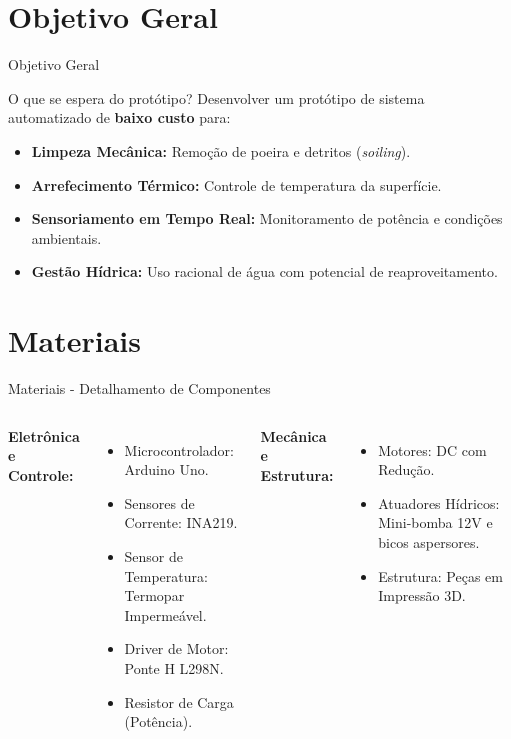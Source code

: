 \documentclass[aspectratio=169, xcolor={table}]{beamer}
\begin{document}

\section{Objetivo Geral}
\begin{frame}{Objetivo Geral}
    \begin{block}{O que se espera do protótipo?}
        Desenvolver um protótipo de sistema automatizado de \textbf{baixo custo} para:
        \begin{itemize}
            \item \textbf{Limpeza Mecânica:} Remoção de poeira e detritos (\textit{soiling}).
            \item \textbf{Arrefecimento Térmico:} Controle de temperatura da superfície.
            \item \textbf{Sensoriamento em Tempo Real:} Monitoramento de potência e condições ambientais.
            \item \textbf{Gestão Hídrica:} Uso racional de água com potencial de reaproveitamento.
        \end{itemize}
    \end{block}
\end{frame}

\section{Materiais}
\begin{frame}{Materiais - Detalhamento de Componentes}
    \begin{columns}
        \textbf{Eletrônica e Controle:}
        \begin{itemize}
            \item Microcontrolador: Arduino Uno.
            \item Sensores de Corrente: INA219.
            \item Sensor de Temperatura: Termopar Impermeável.
            \item Driver de Motor: Ponte H L298N.
            \item Resistor de Carga (Potência).
        \end{itemize}

        \textbf{Mecânica e Estrutura:}
        \begin{itemize}
            \item Motores: DC com Redução.
            \item Atuadores Hídricos: Mini-bomba 12V e bicos aspersores.
            \item Estrutura: Peças em Impressão 3D.
        \end{itemize}
    \end{columns}
\end{frame}
\end{document}
